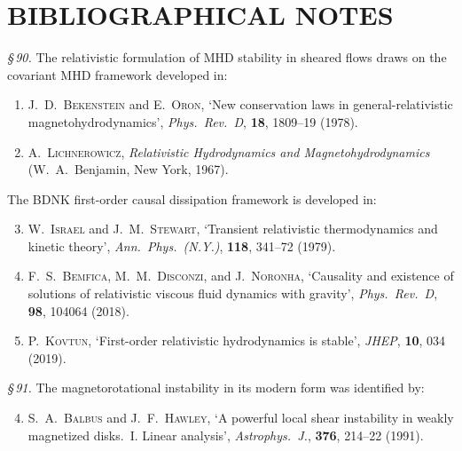 \section*{BIBLIOGRAPHICAL NOTES}

\noindent\textit{\S\,90.}
The relativistic formulation of MHD stability in sheared flows draws
on the covariant MHD framework developed in:

\begin{enumerate}
\item J.~D.~\textsc{Bekenstein} and E.~\textsc{Oron},
  `New conservation laws in general-relativistic magnetohydrodynamics',
  \textit{Phys.\ Rev.\ D}, \textbf{18}, 1809--19 (1978).

\item A.~\textsc{Lichnerowicz},
  \textit{Relativistic Hydrodynamics and Magnetohydrodynamics}
  (W.~A.~Benjamin, New York, 1967).
\end{enumerate}

\noindent The BDNK first-order causal dissipation framework is developed in:

\begin{enumerate}
\setcounter{enumi}{2}
\item W.~\textsc{Israel} and J.~M.~\textsc{Stewart},
  `Transient relativistic thermodynamics and kinetic theory',
  \textit{Ann.\ Phys.\ (N.Y.)}, \textbf{118}, 341--72 (1979).

\item F.~S.~\textsc{Bemfica}, M.~M.~\textsc{Disconzi},
  and J.~\textsc{Noronha},
  `Causality and existence of solutions of relativistic viscous
  fluid dynamics with gravity',
  \textit{Phys.\ Rev.\ D}, \textbf{98}, 104064 (2018).

\item P.~\textsc{Kovtun},
  `First-order relativistic hydrodynamics is stable',
  \textit{JHEP}, \textbf{10}, 034 (2019).
\end{enumerate}

\noindent\textit{\S\,91.}
The magnetorotational instability in its modern form was identified by:

\begin{enumerate}
\setcounter{enumi}{3}
\item S.~A.~\textsc{Balbus} and J.~F.~\textsc{Hawley},
  `A powerful local shear instability in weakly magnetized disks.~I.
  Linear analysis',
  \textit{Astrophys.\ J.}, \textbf{376}, 214--22 (1991).
\end{enumerate}

